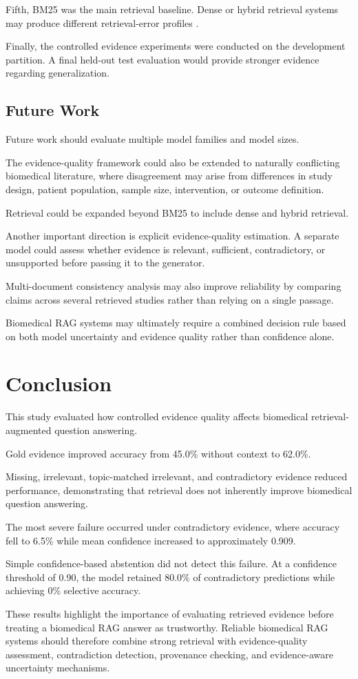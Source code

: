 \documentclass[conference]{IEEEtran}
\begin{document}
Fifth, BM25 was the main retrieval baseline. Dense or hybrid retrieval systems may produce different retrieval-error profiles \cite{karpukhin2020dpr}.

Finally, the controlled evidence experiments were conducted on the development partition. A final held-out test evaluation would provide stronger evidence regarding generalization.

\subsection{Future Work}

Future work should evaluate multiple model families and model sizes.

The evidence-quality framework could also be extended to naturally conflicting biomedical literature, where disagreement may arise from differences in study design, patient population, sample size, intervention, or outcome definition.

Retrieval could be expanded beyond BM25 to include dense and hybrid retrieval.

Another important direction is explicit evidence-quality estimation. A separate model could assess whether evidence is relevant, sufficient, contradictory, or unsupported before passing it to the generator.

Multi-document consistency analysis may also improve reliability by comparing claims across several retrieved studies rather than relying on a single passage.

Biomedical RAG systems may ultimately require a combined decision rule based on both model uncertainty and evidence quality rather than confidence alone.

\section{Conclusion}

This study evaluated how controlled evidence quality affects biomedical retrieval-augmented question answering.

Gold evidence improved accuracy from 45.0\% without context to 62.0\%.

Missing, irrelevant, topic-matched irrelevant, and contradictory evidence reduced performance, demonstrating that retrieval does not inherently improve biomedical question answering.

The most severe failure occurred under contradictory evidence, where accuracy fell to 6.5\% while mean confidence increased to approximately 0.909.

Simple confidence-based abstention did not detect this failure. At a confidence threshold of 0.90, the model retained 80.0\% of contradictory predictions while achieving 0\% selective accuracy.

These results highlight the importance of evaluating retrieved evidence before treating a biomedical RAG answer as trustworthy. Reliable biomedical RAG systems should therefore combine strong retrieval with evidence-quality assessment, contradiction detection, provenance checking, and evidence-aware uncertainty mechanisms.



\end{document}
